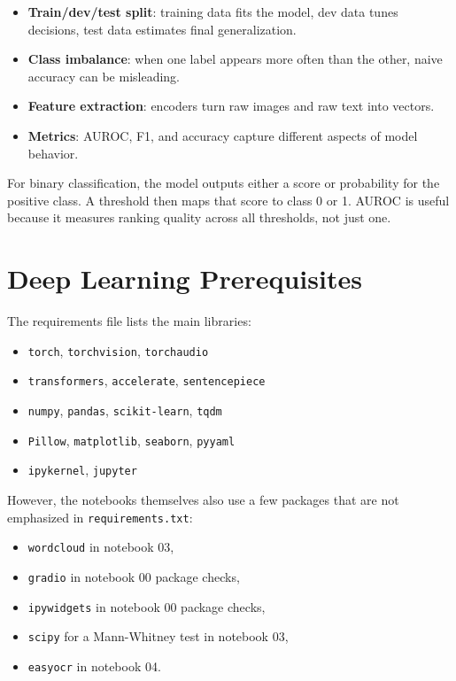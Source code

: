 \documentclass[11pt,a4paper]{report}
\begin{document}
\begin{itemize}
\item \textbf{Train/dev/test split}: training data fits the model, dev data tunes decisions, test data estimates final generalization.
\item \textbf{Class imbalance}: when one label appears more often than the other, naive accuracy can be misleading.
\item \textbf{Feature extraction}: encoders turn raw images and raw text into vectors.
\item \textbf{Metrics}: AUROC, F1, and accuracy capture different aspects of model behavior.
\end{itemize}

For binary classification, the model outputs either a score or probability for the positive class. A threshold then maps that score to class 0 or 1. AUROC is useful because it measures ranking quality across all thresholds, not just one.

\section{Deep Learning Prerequisites}

The requirements file lists the main libraries:

\begin{itemize}
\item \texttt{torch}, \texttt{torchvision}, \texttt{torchaudio}
\item \texttt{transformers}, \texttt{accelerate}, \texttt{sentencepiece}
\item \texttt{numpy}, \texttt{pandas}, \texttt{scikit-learn}, \texttt{tqdm}
\item \texttt{Pillow}, \texttt{matplotlib}, \texttt{seaborn}, \texttt{pyyaml}
\item \texttt{ipykernel}, \texttt{jupyter}
\end{itemize}

However, the notebooks themselves also use a few packages that are not emphasized in \texttt{requirements.txt}:

\begin{itemize}
\item \texttt{wordcloud} in notebook 03,
\item \texttt{gradio} in notebook 00 package checks,
\item \texttt{ipywidgets} in notebook 00 package checks,
\item \texttt{scipy} for a Mann-Whitney test in notebook 03,
\item \texttt{easyocr} in notebook 04.
\end{itemize}
\end{document}
